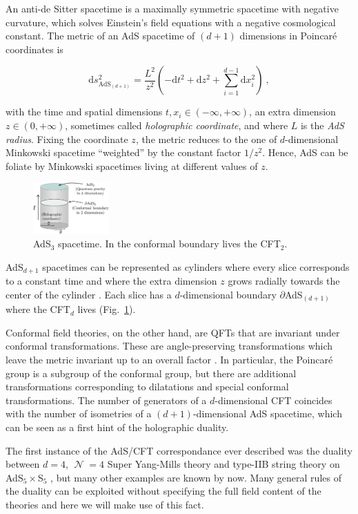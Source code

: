 \documentclass[twocolumn]{revtex4}
\providecommand{\eq}[2]{
    \begin{equation}
        #2
    \label{eq:#1}
    \end{equation}
}
\DeclareMathOperator{\calN}{\mathcal{N}}
\begin{document}
An anti-de Sitter spacetime is a maximally symmetric spacetime with negative curvature, which solves Einstein's field equations with a negative cosmological constant. The metric of an AdS spacetime of $(d+1)$ dimensions in Poincaré coordinates is \cite{kaplan_lectures_nodate}
\eq{AdS_PP-metric}{
    \mathrm{d} s_{\text{AdS}_{(d+1)}}^2 = \frac{L^2}{z^2} \left( -\mathrm{d} t^2 + \mathrm{d} z^2 + \sum_{i=1}^{d-1} \mathrm{d} x_i^2 \right) \ ,
}
with the time and spatial dimensions $t , x_i \in (-\infty,+\infty)$, an extra dimension $z \in (0,+\infty)$, sometimes called \textit{holographic coordinate}, and where $L$ is the \textit{AdS radius}. Fixing the coordinate $z$, the metric reduces to the one of $d$-dimensional Minkowski spacetime ``weighted'' by the constant factor $1/z^2$. Hence, AdS can be foliate by Minkowski spacetimes living at different values of $z$.

\begin{figure}
    \centering
    \includegraphics[width=0.26\textwidth]{../imatges/AdS_Cylindric.png}
\caption{AdS$_3$ spacetime. In the conformal boundary lives the CFT$_2$.}
\label{fig:AdS}
\end{figure}

AdS$_{d+1}$ spacetimes can be represented as cylinders where every slice corresponds to a constant time and where the extra dimension $z$ grows radially towards the center of the cylinder \cite{hawking_large_2008}. Each slice has a $d$-dimensional boundary $\partial$AdS$_{(d+1)}$ where the CFT$_d$ lives (Fig.~\ref{fig:AdS}).

Conformal field theories, on the other hand, are QFTs that are invariant under conformal transformations. These are angle-preserving transformations which leave the metric invariant up to an overall factor \cite{ginsparg_applied_1988}. In particular, the Poincaré group is a subgroup of the conformal group, but there are additional transformations corresponding to dilatations and special conformal transformations. The number of generators of a $d$-dimensional CFT coincides with the number of isometries of a $(d+1)$-dimensional AdS spacetime, which can be seen as a first hint of the holographic duality.

The first instance of the AdS/CFT correspondance ever described was the duality between $d=4$, $\calN=4$ Super Yang-Mills theory and type-IIB string theory on AdS$_5 \times $S$_5$ \cite{maldacena_large_1999}, but many other examples are known by now. Many general rules of the duality can be exploited without specifying the full field content of the theories and here we will make use of this fact.
\end{document}
